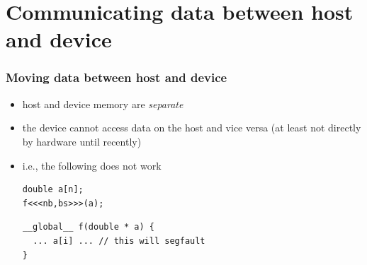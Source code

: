 \documentclass[12pt,dvipdfmx]{beamer}
\newcommand{\aka}[1]{{\color{red}#1}}
\begin{document}
\section{Communicating data between host and device}

\begin{frame}[fragile]
\frametitle{Moving data between host and device}
\begin{itemize}
\item host and device memory are \aka{\it separate}
\item the device cannot access data on the host and vice versa
  (at least not directly by hardware until recently)
\item i.e., the following does not work
\begin{lstlisting}
double a[n];
f<<<nb,bs>>>(a);
\end{lstlisting}

\begin{lstlisting}
__global__ f(double * a) {
  ... a[i] ... // this will segfault
}
\end{lstlisting}
\end{itemize}

\begin{center}
%
\end{center}
\end{frame}
\end{document}
